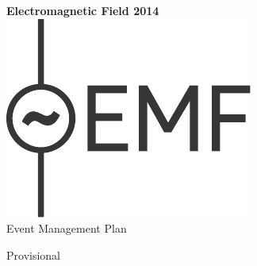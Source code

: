 

\newcommand{\st}{\superscript{st} }
\newcommand{\nd}{\superscript{nd} }
\renewcommand{\th}{\superscript{th} }



\begin{titlepage}
\begin{center}
{\bf \LARGE Electromagnetic Field 2014}\\[36pt]
\includegraphics{emf-logo.pdf}\\[48pt]
{\Large Event Management Plan}

\vfill
Provisional

\end{center}
\end{titlepage}



